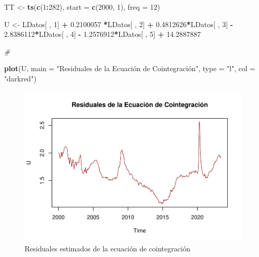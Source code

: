 \documentclass[
]{book}
\newenvironment{Shaded}{\begin{snugshade}}{\end{snugshade}}
\newcommand{\AttributeTok}[1]{\textcolor[rgb]{0.13,0.29,0.53}{#1}}
\newcommand{\CommentTok}[1]{\textcolor[rgb]{0.56,0.35,0.01}{\textit{#1}}}
\newcommand{\DecValTok}[1]{\textcolor[rgb]{0.00,0.00,0.81}{#1}}
\newcommand{\FloatTok}[1]{\textcolor[rgb]{0.00,0.00,0.81}{#1}}
\newcommand{\FunctionTok}[1]{\textcolor[rgb]{0.13,0.29,0.53}{\textbf{#1}}}
\newcommand{\NormalTok}[1]{#1}
\newcommand{\OtherTok}[1]{\textcolor[rgb]{0.56,0.35,0.01}{#1}}
\newcommand{\SpecialCharTok}[1]{\textcolor[rgb]{0.81,0.36,0.00}{\textbf{#1}}}
\newcommand{\StringTok}[1]{\textcolor[rgb]{0.31,0.60,0.02}{#1}}
\begin{document}
\begin{Shaded}
\begin{Highlighting}[]
\NormalTok{TT }\OtherTok{\textless{}{-}} \FunctionTok{ts}\NormalTok{(}\FunctionTok{c}\NormalTok{(}\DecValTok{1}\SpecialCharTok{:}\DecValTok{282}\NormalTok{), }
         \AttributeTok{start =} \FunctionTok{c}\NormalTok{(}\DecValTok{2000}\NormalTok{, }\DecValTok{1}\NormalTok{), }
         \AttributeTok{freq =} \DecValTok{12}\NormalTok{)}

\NormalTok{U }\OtherTok{\textless{}{-}}\NormalTok{ LDatos[ , }\DecValTok{1}\NormalTok{] }\SpecialCharTok{+} \FloatTok{0.2100057} \SpecialCharTok{*}\NormalTok{LDatos[ , }\DecValTok{2}\NormalTok{] }\SpecialCharTok{+} \FloatTok{0.4812626}\SpecialCharTok{*}\NormalTok{LDatos[ , }\DecValTok{3}\NormalTok{] }\SpecialCharTok{{-}} \FloatTok{2.8386112}\SpecialCharTok{*}\NormalTok{LDatos[ , }\DecValTok{4}\NormalTok{] }\SpecialCharTok{{-}} \FloatTok{1.2576912}\SpecialCharTok{*}\NormalTok{LDatos[ , }\DecValTok{5}\NormalTok{] }\SpecialCharTok{+} \FloatTok{14.2887887}

\CommentTok{\#}

\FunctionTok{plot}\NormalTok{(U, }
     \AttributeTok{main =} \StringTok{"Residuales de la Ecuación de Cointegración"}\NormalTok{,}
     \AttributeTok{type =} \StringTok{"l"}\NormalTok{, }
     \AttributeTok{col =} \StringTok{"darkred"}\NormalTok{)}
\end{Highlighting}
\end{Shaded}

\begin{figure}

{\centering \includegraphics{Notas-Series-Tiempo_files/figure-latex/fig84-1} 

}

\caption{Residuales estimados de la ecuación de cointegración}\label{fig:fig84}
\end{figure}
\end{document}
